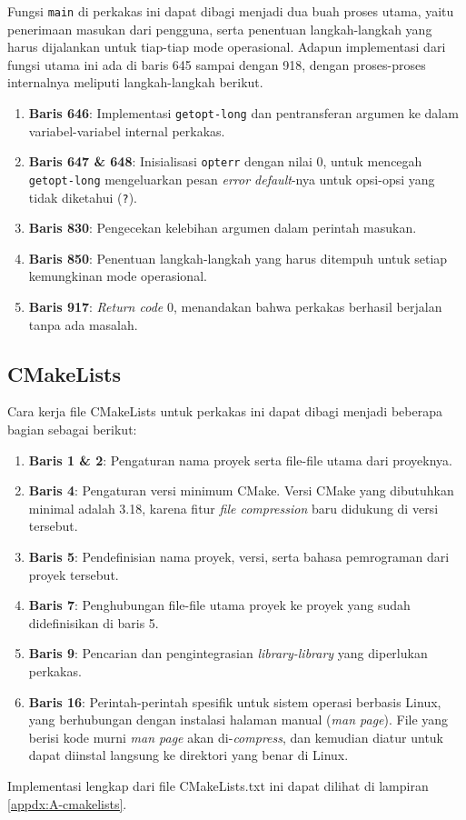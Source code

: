 Fungsi \verb|main| di perkakas ini dapat dibagi menjadi dua buah proses utama, yaitu penerimaan masukan dari pengguna, serta penentuan langkah-langkah yang harus dijalankan untuk tiap-tiap mode operasional. Adapun implementasi dari fungsi utama ini ada di baris 645 sampai dengan 918, dengan proses-proses internalnya meliputi langkah-langkah berikut.

\begin{enumerate}
	\item \textbf{Baris 646}: Implementasi \verb|getopt-long| dan pentransferan argumen ke dalam variabel-variabel internal perkakas.
	\item \textbf{Baris 647 \& 648}: Inisialisasi \verb|opterr| dengan nilai 0, untuk mencegah \verb|getopt-long| mengeluarkan pesan \textit{error default}-nya untuk opsi-opsi yang tidak diketahui (\textquotesingle\verb|?|\textquotesingle). 
	\item \textbf{Baris 830}: Pengecekan kelebihan argumen dalam perintah masukan.
	\item \textbf{Baris 850}: Penentuan langkah-langkah yang harus ditempuh untuk setiap kemungkinan mode operasional.
	\item \textbf{Baris 917}: \textit{Return code} 0, menandakan bahwa perkakas berhasil berjalan tanpa ada masalah.
\end{enumerate}

\subsection{CMakeLists}
\label{sec:testing-implementation-cmakelists}

Cara kerja file CMakeLists untuk perkakas ini dapat dibagi menjadi beberapa bagian sebagai berikut:

\begin{enumerate}
	\item \textbf{Baris 1 \& 2}: Pengaturan nama proyek serta file-file utama dari proyeknya.
	\item \textbf{Baris 4}: Pengaturan versi minimum CMake. Versi CMake yang dibutuhkan minimal adalah 3.18, karena fitur \textit{file compression} baru didukung di versi tersebut.
	\item \textbf{Baris 5}: Pendefinisian nama proyek, versi, serta bahasa pemrograman dari proyek tersebut.
	\item \textbf{Baris 7}: Penghubungan file-file utama proyek ke proyek yang sudah didefinisikan di baris 5.
	\item \textbf{Baris 9}: Pencarian dan pengintegrasian \textit{library-library} yang diperlukan perkakas.
	\item \textbf{Baris 16}: Perintah-perintah spesifik untuk sistem operasi berbasis Linux, yang berhubungan dengan instalasi halaman manual (\textit{man page}). File yang berisi kode murni \textit{man page} akan di-\textit{compress}, dan kemudian diatur untuk dapat diinstal langsung ke direktori yang benar di Linux.
\end{enumerate}
\noindent
Implementasi lengkap dari file CMakeLists.txt ini dapat dilihat di lampiran \ref{appdx:A-cmakelists}.


